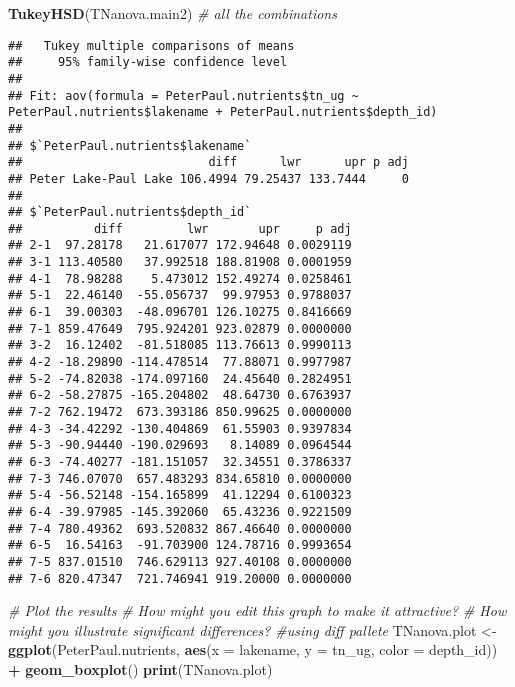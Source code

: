\documentclass[]{article}
\newenvironment{Shaded}{\begin{snugshade}}{\end{snugshade}}
\newcommand{\KeywordTok}[1]{\textcolor[rgb]{0.13,0.29,0.53}{\textbf{#1}}}
\newcommand{\DataTypeTok}[1]{\textcolor[rgb]{0.13,0.29,0.53}{#1}}
\newcommand{\StringTok}[1]{\textcolor[rgb]{0.31,0.60,0.02}{#1}}
\newcommand{\CommentTok}[1]{\textcolor[rgb]{0.56,0.35,0.01}{\textit{#1}}}
\newcommand{\OperatorTok}[1]{\textcolor[rgb]{0.81,0.36,0.00}{\textbf{#1}}}
\newcommand{\NormalTok}[1]{#1}
\begin{document}
\begin{Shaded}
\begin{Highlighting}[]
\KeywordTok{TukeyHSD}\NormalTok{(TNanova.main2) }\CommentTok{# all the combinations}
\end{Highlighting}
\end{Shaded}

\begin{verbatim}
##   Tukey multiple comparisons of means
##     95% family-wise confidence level
## 
## Fit: aov(formula = PeterPaul.nutrients$tn_ug ~ PeterPaul.nutrients$lakename + PeterPaul.nutrients$depth_id)
## 
## $`PeterPaul.nutrients$lakename`
##                          diff      lwr      upr p adj
## Peter Lake-Paul Lake 106.4994 79.25437 133.7444     0
## 
## $`PeterPaul.nutrients$depth_id`
##          diff         lwr       upr     p adj
## 2-1  97.28178   21.617077 172.94648 0.0029119
## 3-1 113.40580   37.992518 188.81908 0.0001959
## 4-1  78.98288    5.473012 152.49274 0.0258461
## 5-1  22.46140  -55.056737  99.97953 0.9788037
## 6-1  39.00303  -48.096701 126.10275 0.8416669
## 7-1 859.47649  795.924201 923.02879 0.0000000
## 3-2  16.12402  -81.518085 113.76613 0.9990113
## 4-2 -18.29890 -114.478514  77.88071 0.9977987
## 5-2 -74.82038 -174.097160  24.45640 0.2824951
## 6-2 -58.27875 -165.204802  48.64730 0.6763937
## 7-2 762.19472  673.393186 850.99625 0.0000000
## 4-3 -34.42292 -130.404869  61.55903 0.9397834
## 5-3 -90.94440 -190.029693   8.14089 0.0964544
## 6-3 -74.40277 -181.151057  32.34551 0.3786337
## 7-3 746.07070  657.483293 834.65810 0.0000000
## 5-4 -56.52148 -154.165899  41.12294 0.6100323
## 6-4 -39.97985 -145.392060  65.43236 0.9221509
## 7-4 780.49362  693.520832 867.46640 0.0000000
## 6-5  16.54163  -91.703900 124.78716 0.9993654
## 7-5 837.01510  746.629113 927.40108 0.0000000
## 7-6 820.47347  721.746941 919.20000 0.0000000
\end{verbatim}

\begin{Shaded}
\begin{Highlighting}[]
\CommentTok{# Plot the results}
\CommentTok{# How might you edit this graph to make it attractive?}
\CommentTok{# How might you illustrate significant differences? #using diff pallete}
\NormalTok{TNanova.plot <-}\StringTok{ }\KeywordTok{ggplot}\NormalTok{(PeterPaul.nutrients, }\KeywordTok{aes}\NormalTok{(}\DataTypeTok{x =}\NormalTok{ lakename, }\DataTypeTok{y =}\NormalTok{ tn_ug, }\DataTypeTok{color =}\NormalTok{ depth_id)) }\OperatorTok{+}
\StringTok{  }\KeywordTok{geom_boxplot}\NormalTok{()}
\KeywordTok{print}\NormalTok{(TNanova.plot)}
\end{Highlighting}
\end{Shaded}
\end{document}
